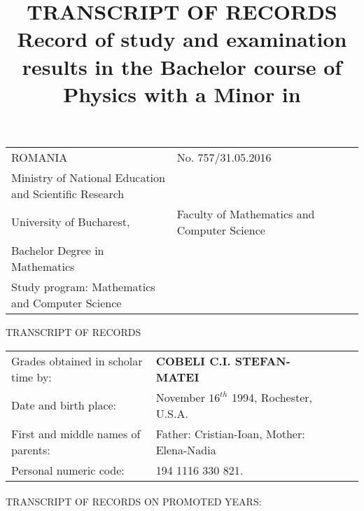 \documentclass[a4paper,9pt,final]{scrartcl}
\title{\textbf{TRANSCRIPT OF RECORDS}\\[0.5em]
Record of study and examination results in the
Bachelor course of Physics
with a Minor in \ergfach}
\author{}
\begin{document}

\begin{tabular}{llcll}
	
	ROMANIA & \hfill No. 757/31.05.2016 \\
	Ministry of National Education and Scientific Research \\
	University of Bucharest, & 	Faculty of Mathematics and Computer Science \\
	Bachelor Degree in Mathematics \\
	Study program: Mathematics and Computer Science\\
	
	
		
\end{tabular}

\begin{center}
	\begin{Large}TRANSCRIPT OF RECORDS\end{Large}

	\vspace{3em}

	
\end{center}

\begin{tabular}{llcll}
	
	Grades obtained	in scholar time by: &\textbf{COBELI C.I. STEFAN-MATEI} \\
	Date and birth place: & November $16^{th}$ 1994, Rochester, U.S.A.\\
	First and middle names of parents: & Father: Cristian-Ioan, Mother: Elena-Nadia\\
	Personal numeric code: & 194 1116 330 821.
	
	
\end{tabular}
\paragraph{}
TRANSCRIPT OF RECORDS ON PROMOTED YEARS:
\end{document}
